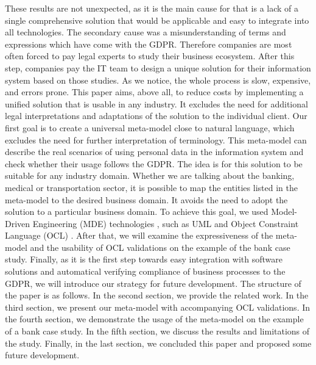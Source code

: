 \documentclass[11pt,english]{article}
\begin{document}
\newline These results are not unexpected, as it is the main cause for that is a lack of a single comprehensive solution that would be applicable and easy to integrate into all technologies. The secondary cause was a misunderstanding of terms and expressions which have come with the GDPR. Therefore companies are most often forced to pay legal experts to study their business ecosystem. After this step, companies pay the IT team to design a unique solution for their information system based on those studies. As we notice, the whole process is slow, expensive, and errors prone. \newline This paper aims, above all, to reduce costs by implementing a unified solution that is usable in any industry. It excludes the need for additional legal interpretations and adaptations of the solution to the individual client. Our first goal is to create a universal meta-model close to natural language, which excludes the need for further interpretation of terminology. This meta-model can describe the real scenarios of using personal data in the information system and check whether their usage follows the GDPR. The idea is for this solution to be suitable for any industry domain. Whether we are talking about the banking, medical or transportation sector, it is possible to map the entities listed in the meta-model to the desired business domain. It avoids the need to adopt the solution to a particular business domain. To achieve this goal, we used Model-Driven Engineering (MDE) technologies \cite{mde}, such as UML \cite{uml} and Object Constraint Language (OCL) \cite{ocl}. After that, we will examine the expressiveness of the meta-model and the usability of OCL validations on the example of the bank case study. Finally, as it is the first step towards easy integration with software solutions and automatical verifying compliance of business processes to the GDPR, we will introduce our strategy for future development. \newline The structure of the paper is as follows. In the second section, we provide the related work. In the third section, we present our meta-model with accompanying OCL validations. In the fourth section, we demonstrate the usage of the meta-model on the example of a bank case study. In the fifth section, we discuss the results and limitations of the study. Finally, in the last section, we concluded this paper and proposed some future development.
\end{document}

